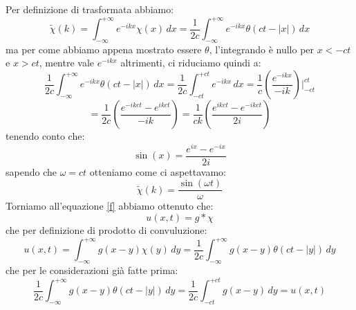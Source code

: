 \documentclass[12pt]{article}
\begin{document}
Per definizione di trasformata abbiamo:
\[\tilde{\chi}(k) = \int_{-\infty}^{+\infty}e^{-ikx}\chi(x)\,dx =\frac{1}{2c}\int_{-\infty}^{+\infty}e^{-ikx}\theta(ct-|x|)\,dx \]
ma per come abbiamo appena mostrato essere $\theta$, l'integrando è nullo per $x<-ct$ e $x>ct$, mentre vale $e^{-ikx}$ altrimenti, ci riduciamo quindi a:
\[\frac{1}{2c}\int_{-\infty}^{+\infty}e^{-ikx}\theta(ct-|x|)\,dx = \frac{1}{2c}\int_{-ct}^{+ct}e^{-ikx}\,dx = \frac{1}{c}\left(\frac{e^{-ikx}}{-ik}\right)\bigg\vert_{-ct}^{ct}\]
\[= \frac{1}{2c}\left(\frac{e^{-ikct}-e^{ikct}}{-ik} \right) =\frac{1}{ck}\left(\frac{e^{ikct}-e^{-ikct}}{2i} \right) \]
tenendo conto che:
\[\sin(x) = \frac{e^{ix}-e^{-ix}}{2i}\]
sapendo che $\omega=ct$ otteniamo come ci aspettavamo:
\[\tilde{\chi}(k) =\frac{\sin(\omega t)} {\omega}\]
Torniamo all'equazione \eqref{f} abbiamo ottenuto che:
\[u(x,t) = g*\chi\]
che per definizione di prodotto di convuluzione:
\[u(x,t) = \int_{-\infty}^{+\infty}g(x-y)\chi(y)\,dy = \frac{1}{2c}\int_{-\infty}^{+\infty}g(x-y)\theta(ct-|y|)\,dy\]
che per le considerazioni già fatte prima:
\[\frac{1}{2c}\int_{-\infty}^{+\infty}g(x-y)\theta(ct-|y|)\,dy=\frac{1}{2c}\int_{-ct}^{+ct}g(x-y)\,dy = u(x,t)\]
\end{document}
